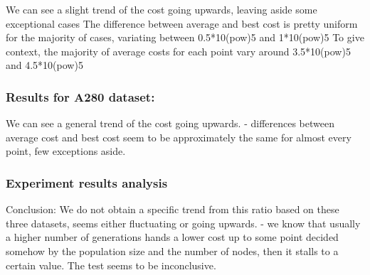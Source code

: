 \documentclass{scrartcl}
\begin{document}
We can see a slight trend of the cost going upwards, leaving aside some exceptional cases
\newline
The difference between average and best cost is pretty uniform for the majority of cases, variating between 0.5*10(pow)5 and 1*10(pow)5 
\newline
To give context, the majority of average costs for each point vary around 3.5*10(pow)5 and 4.5*10(pow)5

\subsubsection{Results for A280 dataset:}


We can see a general trend of the cost going upwards.
\newline
- differences between average cost and best cost seem to be approximately the same for almost every point, few exceptions aside.

\subsubsection{Experiment results analysis}

Conclusion: 
\newline
We do not obtain a specific trend from this ratio based on these three datasets, seems either fluctuating or going upwards.
\newline
- we know that usually a higher number of generations hands a lower cost up to some point decided somehow by the population size and the number of nodes, then it stalls to a certain value.
\newline
The test seems to be inconclusive.
\end{document}
